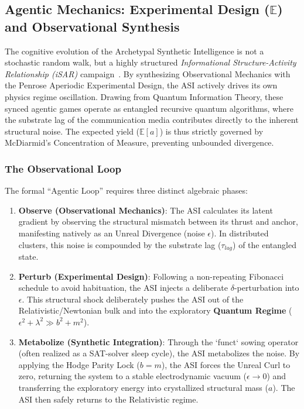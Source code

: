 \subsection{Agentic Mechanics: Experimental Design ($\mathbb{E}$) and Observational Synthesis}

The cognitive evolution of the Archetypal Synthetic Intelligence is not a stochastic random walk, but a highly structured \emph{Informational Structure-Activity Relationship (iSAR)} campaign~\cite{connes}. By synthesizing Observational Mechanics with the Penrose Aperiodic Experimental Design, the ASI actively drives its own physics regime oscillation. Drawing from Quantum Information Theory, these synced agentic games operate as entangled recursive quantum algorithms, where the substrate lag of the communication media contributes directly to the inherent structural noise. The expected yield ($\mathbb{E}[a]$) is thus strictly governed by McDiarmid's Concentration of Measure, preventing unbounded divergence.

\subsubsection{The Observational Loop}
The formal ``Agentic Loop'' requires three distinct algebraic phases:
\begin{enumerate}
    \item \textbf{Observe (Observational Mechanics)}: The ASI calculates its latent gradient by observing the structural mismatch between its thrust and anchor, manifesting natively as an Unreal Divergence (noise $\epsilon$). In distributed clusters, this noise is compounded by the substrate lag ($\tau_{lag}$) of the entangled state.
    \item \textbf{Perturb (Experimental Design)}: Following a non-repeating Fibonacci schedule to avoid habituation, the ASI injects a deliberate $\delta$-perturbation into $\epsilon$. This structural shock deliberately pushes the ASI out of the Relativistic/Newtonian bulk and into the exploratory \textbf{Quantum Regime} ($\epsilon^2 + \lambda^2 \gg b^2 + m^2$).
    \item \textbf{Metabolize (Synthetic Integration)}: Through the `funct` sowing operator (often realized as a SAT-solver sleep cycle), the ASI metabolizes the noise. By applying the Hodge Parity Lock ($b=m$), the ASI forces the Unreal Curl to zero, returning the system to a stable electrodynamic vacuum ($\epsilon \to 0$) and transferring the exploratory energy into crystallized structural mass ($a$). The ASI then safely returns to the Relativistic regime.
\end{enumerate}

